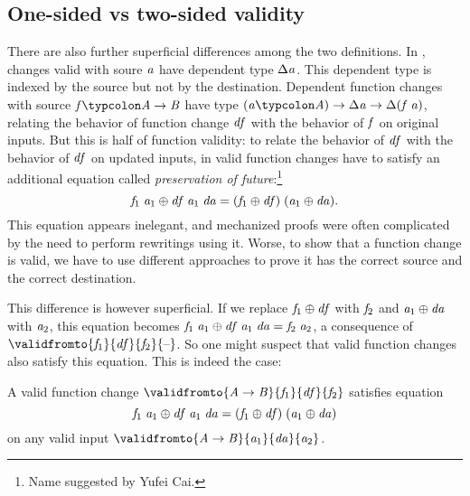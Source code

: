 \subsection{One-sided vs two-sided validity}
There are also further superficial differences among the two definitions.
In \ilcA{}, changes valid with soure \ensuremath{\Varid{a}} have dependent type \ensuremath{\Delta \Varid{a}}. This
dependent type is indexed by the source but not by the destination. Dependent
function changes with source \ensuremath{\Varid{f}\typcolon\Conid{A}\to \Conid{B}} have type \ensuremath{(\Varid{a}\typcolon\Conid{A})\to \Delta \Varid{a}\to \Delta (\Varid{f}\;\Varid{a})}, relating the behavior of function change \ensuremath{\Varid{df}} with the behavior of \ensuremath{\Varid{f}} on
original inputs. But this is half of function validity: to relate the behavior of \ensuremath{\Varid{df}}
with the behavior of \ensuremath{\Varid{df}} on updated inputs,
in \ilcA{} valid function changes have to satisfy an additional
equation called \emph{preservation of future}:\footnote{Name suggested by Yufei Cai.}
  \[\mathit{f}_{1}\;\mathit{a}_{1}\oplus \mathit{df}\;\mathit{a}_{1}\;\mathit{da}\mathrel{=}(\mathit{f}_{1}\oplus \mathit{df})\;(\mathit{a}_{1}\oplus \mathit{da}).\]
This equation appears inelegant, and mechanized proofs were often complicated by the
need to perform rewritings using it. Worse, to show that a function change is
valid, we have to use different approaches to prove it has the correct source
and the correct destination.

This difference is however superficial.
If we replace \ensuremath{\Varid{f}_{1}\oplus \Varid{df}} with \ensuremath{\Varid{f}_{2}} and \ensuremath{\Varid{a}_{1}\oplus \Varid{da}} with \ensuremath{\Varid{a}_{2}}, this
equation becomes \ensuremath{\Varid{f}_{1}\;\Varid{a}_{1}\oplus \Varid{df}\;\Varid{a}_{1}\;\Varid{da}\mathrel{=}\Varid{f}_{2}\;\Varid{a}_{2}}, a consequence of \ensuremath{\validfromto{\Varid{f}_{1}}{\Varid{df}}{\Varid{f}_{2}}{\text{\textendash}}}. So one might suspect that \ilcB{} valid function changes also satisfy this
equation. This is indeed the case:

\begin{lemma}
  A valid function change \ensuremath{\validfromto{\Conid{A}\to \Conid{B}}{\Varid{f}_{1}}{\Varid{df}}{\Varid{f}_{2}}} satisfies equation
  \[\mathit{f}_{1}\;\mathit{a}_{1}\oplus \mathit{df}\;\mathit{a}_{1}\;\mathit{da}\mathrel{=}(\mathit{f}_{1}\oplus \mathit{df})\;(\mathit{a}_{1}\oplus \mathit{da})\]
  on any valid input \ensuremath{\validfromto{\Conid{A}\to \Conid{B}}{\Varid{a}_{1}}{\Varid{da}}{\Varid{a}_{2}}}.
\end{lemma}

